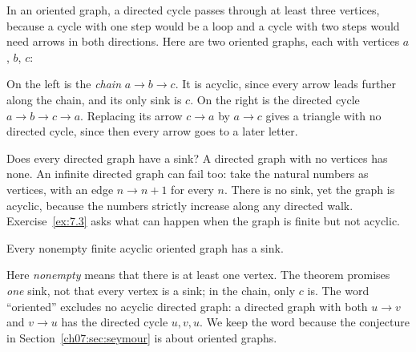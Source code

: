 In an oriented graph, a directed cycle passes through at least three vertices, because a cycle with one step would be a loop and a cycle with two steps would need arrows in both directions. Here are two oriented graphs, each with vertices $a$, $b$, $c$:
\begin{center}
\end{center}
On the left is the \emph{chain} $a\to b\to c$. It is acyclic, since every arrow leads further along the chain, and its only sink is $c$. On the right is the directed cycle $a\to b\to c\to a$. Replacing its arrow $c\to a$ by $a\to c$ gives a triangle with no directed cycle, since then every arrow goes to a later letter.

Does every directed graph have a sink? A directed graph with no vertices has none. An infinite directed graph can fail too: take the natural numbers as vertices, with an edge $n\to n+1$ for every $n$. There is no sink, yet the graph is acyclic, because the numbers strictly increase along any directed walk. Exercise~\ref{ex:7.3} asks what can happen when the graph is finite but not acyclic.

\par\noindent\begin{minipage}{\linewidth}
\begin{theorem}\label{thm:sink}
Every nonempty finite acyclic oriented graph has a sink.
\end{theorem}
\end{minipage}\par

Here \emph{nonempty} means that there is at least one vertex. The theorem promises \emph{one} sink, not that every vertex is a sink; in the chain, only $c$ is. The word ``oriented'' excludes no acyclic directed graph: a directed graph with both $u\to v$ and $v\to u$ has the directed cycle $u,v,u$. We keep the word because the conjecture in Section~\ref{ch07:sec:seymour} is about oriented graphs.

